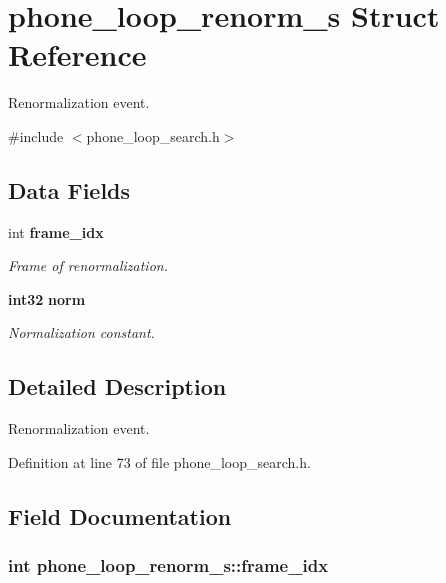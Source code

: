 \section{phone\-\_\-loop\-\_\-renorm\-\_\-s \-Struct \-Reference}
\label{structphone__loop__renorm__s}


\-Renormalization event.  




{\ttfamily \#include $<$phone\-\_\-loop\-\_\-search.\-h$>$}

\subsection*{\-Data \-Fields}
\begin{DoxyCompactItemize}
\item 
int {\bf frame\-\_\-idx}
\begin{DoxyCompactList}\small\item\em \-Frame of renormalization. \end{DoxyCompactList}\item 
{\bf int32} {\bf norm}
\begin{DoxyCompactList}\small\item\em \-Normalization constant. \end{DoxyCompactList}\end{DoxyCompactItemize}


\subsection{\-Detailed \-Description}
\-Renormalization event. 

\-Definition at line 73 of file phone\-\_\-loop\-\_\-search.\-h.



\subsection{\-Field \-Documentation}
\subsubsection[{frame\-\_\-idx}]{\setlength{\rightskip}{0pt plus 5cm}int {\bf phone\-\_\-loop\-\_\-renorm\-\_\-s\-::frame\-\_\-idx}}\label{structphone__loop__renorm__s_af54c31c6d417b769b088b898294a135e}


